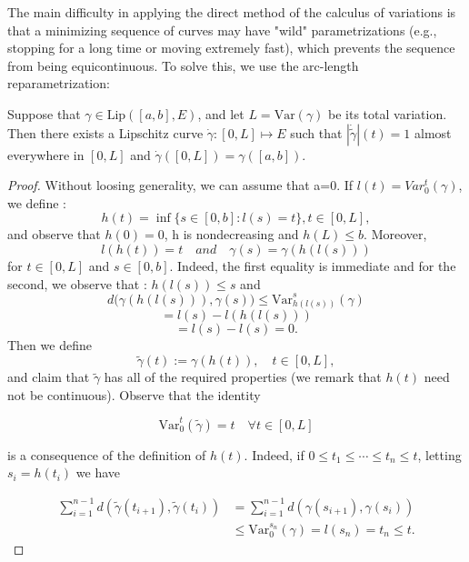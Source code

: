 \documentclass[12pt]{article}
\begin{document}
{The main difficulty in applying the direct method of the calculus of variations is that a minimizing sequence of curves may have "wild" parametrizations (e.g., stopping for a long time or moving extremely fast), which prevents the sequence from being equicontinuous. To solve this, we use the arc-length reparametrization:

\begin{theorem}[Reparametrization] \cite{ambrosio2004topics}
    Suppose that $\gamma \in \mathrm{Lip}([a,b],E)$, and let $L = \mathrm{Var}(\gamma)$ be its total variation. Then there exists a Lipschitz curve $\dot{\gamma} : [0,L] \mapsto E$ such that $|\dot{\tilde{\gamma}}|(t) = 1$ almost everywhere in $[0,L]$ and $ \dot\gamma([0,L]) = \gamma([a,b])$.
\end{theorem}

\begin{proof}
    Without loosing generality, we can assume that a=0. If $l(t)=Var^t_{0}(\gamma)$, we define : 
    $$
    h(t)=\inf \{ s \in [0,b] : l(s)=t \}, t \in [0,L],
    $$
    and observe that $h(0)=0$, h is nondecreasing and $h(L) \leq b$. Moreover, 
    \begin{equation}
    l(h(t))=t \quad and \quad \gamma(s)=\gamma(h(l(s))) \tag{1}
    \end{equation}
    for $t \in [0,L]$ and $s \in [0,b]$. Indeed, the first equality is immediate and for the second, we observe that : $h(l(s)) \leqslant s$ and
    $$
    d\big(\gamma(h(l(s))), \gamma(s)\big) \leqslant \mathrm{Var}^{s}_{h(l(s))}(\gamma)
    $$
    $$
    = l(s) - l(h(l(s)))
    $$
    $$
    = l(s) - l(s) = 0.
    $$
    Then we define
    $$
    \tilde{\gamma}(t) := \gamma(h(t)), \quad t \in [0, L],
    $$
    and claim that $\tilde{\gamma}$ has all of the required properties (we remark that $h(t)$ need not be continuous). Observe that the identity

    \begin{equation}
    \mathrm{Var}_0^t(\tilde{\gamma}) = t \quad \forall t \in [0, L] \tag{2}
    \end{equation}

    is a consequence of the definition of $h(t)$. Indeed, if $0 \leqslant t_1 \leqslant \cdots \leqslant t_n \leqslant t$, letting $s_i = h(t_i)$ we have

    \begin{align*}
        \sum_{i=1}^{n-1} d\!\left(\tilde{\gamma}(t_{i+1}),\tilde{\gamma}(t_i)\right)
        &= \sum_{i=1}^{n-1} d\!\left(\gamma(s_{i+1}), \gamma(s_i)\right) \\
        &\leqslant \mathrm{Var}_0^{s_n}(\gamma) = l(s_n) = t_n \leqslant t.
    \end{align*}


\end{proof}}
\end{document}
